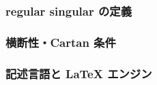 \subsubsection*{regular singular の定義}

\subsubsection*{横断性・Cartan 条件}

\subsubsection*{記述言語と LaTeX エンジン}

